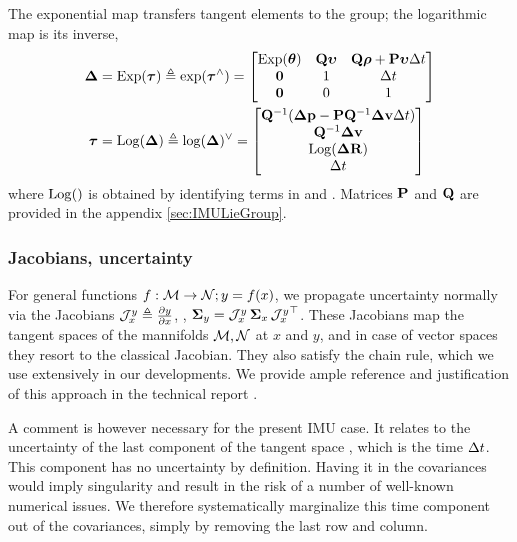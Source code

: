 The exponential map transfers tangent elements to the group; the logarithmic map is its inverse,
%
\begin{align}
    \D &= \Exp(\bftau) \te \exp(\bftau\hhat) = \begin{bmatrix}
    \Exp(\bth) & \bfQ\bfupsilon & \bfQ\bfrho+\bfP\bfupsilon\Dt \\
    \bf0 & 1 & \Dt \\
    \bf0 & 0 & 1
    \end{bmatrix} %
    \label{equ:exp}
    \\
    \bftau &= \Log(\D) \te \log(\D)\vvee = \begin{bmatrix}
    \bfQ\inv(\Dp-\bfP\bfQ\inv\Dv\Dt) \\
    \bfQ\inv\Dv \\
    \Log(\DR) \\
    \Dt 
    \end{bmatrix} %
    \label{equ:log}
\end{align}
%
where $\operatorname*{Log}()$ is obtained by identifying terms in  and .
Matrices ${\bf P}$ and ${\bf Q}$ are provided in the appendix \ref{sec:IMULieGroup}.


\subsubsection{Jacobians, uncertainty}
\label{sec:uncertainty}

For general functions $f:\mathcal{M}\to\mathcal{N};y=f(x)$, we propagate uncertainty normally via the Jacobians ${\mathcal{J}^{y}_{x}}\triangleq\frac{\partial y}{\partial x}$, \ie, ${\bm \Sigma}_y={\mathcal{J}^{y}_{x}}\,{\bm \Sigma}_x\,{\mathcal{J}^{y}_{x}}^{\top}$. 
These Jacobians map the tangent spaces of the mannifolds $\mathcal{M},\mathcal{N}$ at $x$ and $y$, and in case of vector spaces they resort to the classical Jacobian.
They also satisfy the chain rule, which we use extensively in our developments.
We provide ample reference and justification of this approach in the technical report \cite{sola2018micro}.

A comment is however necessary for the present IMU case.
It relates to the uncertainty of the last component of the tangent space , which is the time $\Delta t$. This component has no uncertainty by definition. 
Having it in the covariances would imply singularity and result in the risk of a number of well-known numerical issues. 
We therefore systematically marginalize this time component out of the covariances, simply by removing the last row and column. 



